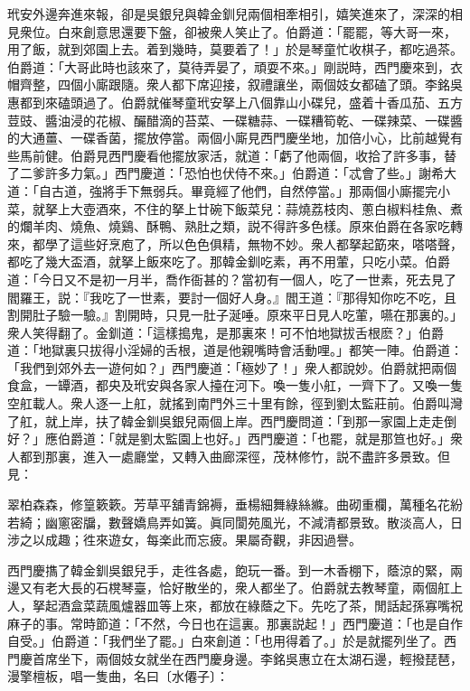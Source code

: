 玳安外邊奔進來報，卻是吳銀兒與韓金釧兒兩個相牽相引，嬉笑進來了，深深的相見衆位。白來創意思還要下盤，卻被衆人笑止了。伯爵道：「罷罷，等大哥一來，用了飯，就到郊園上去。着到幾時，莫要着了！」於是琴童忙收棋子，都吃過茶。伯爵道：「大哥此時也該來了，莫待弄晏了，頑耍不來。」剛説時，西門慶來到，衣帽齊整，四個小廝跟隨。衆人都下席迎接，叙禮讓坐，兩個妓女都磕了頭。李銘吳惠都到來磕頭過了。伯爵就催琴童玳安拏上八個靠山小碟兒，盛着十香瓜茄、五方荳豉、醬油浸的花椒、釅醋滴的苔菜、一碟糖蒜、一碟糟筍乾、一碟辣菜、一碟醬的大通薑、一碟香菌，擺放停當。兩個小廝見西門慶坐地，加倍小心，比前越覺有些馬前健。伯爵見西門慶看他擺放家活，就道：「虧了他兩個，收拾了許多事，替了二爹許多力氣。」西門慶道：「恐怕也伏侍不來。」伯爵道：「忒會了些。」謝希大道：「自古道，強將手下無弱兵。畢竟經了他們，自然停當。」那兩個小廝擺完小菜，就拏上大壺酒來，不住的拏上廿碗下飯菜兒：蒜燒荔枝肉、蔥白椒料桂魚、煮的爛羊肉、燒魚、燒鷄、酥鴨、熟肚之類，説不得許多色樣。原來伯爵在各家吃轉來，都學了這些好烹庖了，所以色色俱精，無物不妙。衆人都拏起筯來，嗒嗒聲，都吃了幾大盃酒，就拏上飯來吃了。那韓金釧吃素，再不用葷，只吃小菜。伯爵道：「今日又不是初一月半，喬作衙甚的？當初有一個人，吃了一世素，死去見了閻羅王，説：『我吃了一世素，要討一個好人身。』閻王道：『那得知你吃不吃，且割開肚子驗一驗。』割開時，只見一肚子涎唾。原來平日見人吃葷，嚥在那裏的。」衆人笑得翻了。金釧道：「這樣搗鬼，是那裏來！可不怕地獄拔舌根麽？」伯爵道：「地獄裏只拔得小淫婦的舌根，道是他親嘴時會活動哩。」都笑一陣。伯爵道：「我們到郊外去一遊何如？」西門慶道：「極妙了！」衆人都說妙。伯爵就把兩個食盒，一罈酒，都央及玳安與各家人擡在河下。喚一隻小舡，一齊下了。又喚一隻空舡載人。衆人逐一上舡，就搖到南門外三十里有餘，徑到劉太監莊前。伯爵叫灣了舡，就上岸，扶了韓金釧吳銀兒兩個上岸。西門慶問道：「到那一家園上走走倒好？」應伯爵道：「就是劉太監園上也好。」西門慶道：「也罷，就是那笪也好。」衆人都到那裏，進入一處廳堂，又轉入曲廊深徑，茂林修竹，説不盡許多景致。但見：

\begin{myquote}
翠柏森森，修篁簌簌。芳草平舖青錦褥，垂楊細舞綠絲縧。曲砌重欄，萬種名花紛若綺；幽窻密牖，數聲嬌鳥弄如簧。眞同閬苑風光，不減清都景致。散淡高人，日涉之以成趣；徃來遊女，每楽此而忘疲。果屬奇觀，非因過譽。
\end{myquote}

西門慶㩦了韓金釧吳銀兒手，走徃各處，飽玩一番。到一木香棚下，蔭涼的緊，兩邊又有老大長的石櫈琴臺，恰好散坐的，衆人都坐了。伯爵就去教琴童，兩個舡上人，拏起酒盒菜蔬風爐器皿等上來，都放在綠蔭之下。先吃了茶，閒話起孫寡嘴祝麻子的事。常時節道：「不然，今日也在這裏。那裏説起！」西門慶道：「也是自作自受。」伯爵道：「我們坐了罷。」白來創道：「也用得着了。」於是就擺列坐了。西門慶首席坐下，兩個妓女就坐在西門慶身邊。李銘吳惠立在太湖石邊，輕撥琵琶，漫擎檀板，唱一隻曲，名曰〔水僊子〕：

